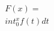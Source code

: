 \documentclass[preview]{standalone}
\begin{document}
\begin{align*}
F(x) = \\int_0^x f(t)dt
\end{align*}
\end{document}
